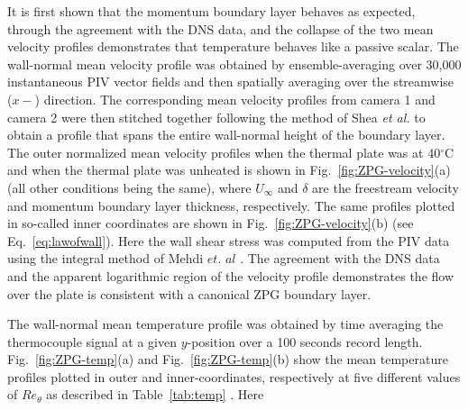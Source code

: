 It is first shown that the momentum boundary layer behaves as expected, through the agreement with the DNS data, and the collapse of the two mean velocity profiles demonstrates that temperature behaves like a passive scalar. The wall-normal mean velocity profile was obtained by ensemble-averaging over 30,000 instantaneous PIV vector fields and then spatially averaging over the streamwise ($x-$) direction. The corresponding mean velocity profiles from camera 1 and camera 2 were then stitched together following the method of Shea \textit{et al.} \cite{Shea2014} to obtain a profile that spans the entire wall-normal height of the boundary layer. The outer normalized mean velocity profiles when the thermal plate was at 40$^\circ$C and when the thermal plate was unheated is shown in Fig.~\ref{fig:ZPG-velocity}(a) (all other conditions being the same), where $U_\infty$ and $\delta$ are the freestream velocity and momentum boundary layer thickness, respectively. The same profiles plotted in so-called inner coordinates are shown  in Fig.~\ref{fig:ZPG-velocity}(b) (see Eq.~\ref{eq:lawofwall}). Here the wall shear stress was computed from the PIV data using the integral method of Mehdi $\textit{et. al}$ \cite{Mehdi2011}.  The agreement with the DNS data and the apparent logarithmic region of the velocity profile demonstrates the flow over the plate is consistent with a canonical ZPG boundary layer.


\begin{table}[h]
\caption{Parameters for measured temperature profiles}
\centering
{}
\label{tab:temp}
\end{table}
The wall-normal mean temperature profile was obtained by time averaging the thermocouple signal at a given $y$-position over a 100 seconds record length. Fig.~\ref{fig:ZPG-temp}(a) and Fig.~\ref{fig:ZPG-temp}(b) show the mean temperature profiles plotted in outer and inner-coordinates, respectively at five different values of $Re_\theta$ as described in Table~\ref{tab:temp} . Here 

